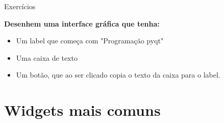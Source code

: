 \documentclass{beamer}
\begin{document}
    \begin{frame}{Exercícios}
        
        
        \textbf{Desenhem uma interface gráfica que tenha:}
        \begin{itemize}
            \item Um label que começa com "Programação pyqt"
            \item Uma caixa de texto
            \item Um botão, que ao ser clicado copia o texto da caixa para o label.
        \end{itemize}
        
    \end{frame}
    
    \section{Widgets mais comuns}
    
\end{document}
